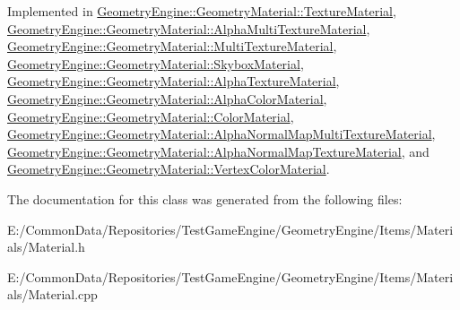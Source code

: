 Implemented in \mbox{\hyperlink{class_geometry_engine_1_1_geometry_material_1_1_texture_material_a985cdde7240f2acb18cd2944c5ca6193}{Geometry\+Engine\+::\+Geometry\+Material\+::\+Texture\+Material}}, \mbox{\hyperlink{class_geometry_engine_1_1_geometry_material_1_1_alpha_multi_texture_material_ad230fe9a3f174933644c40ed10ba15a7}{Geometry\+Engine\+::\+Geometry\+Material\+::\+Alpha\+Multi\+Texture\+Material}}, \mbox{\hyperlink{class_geometry_engine_1_1_geometry_material_1_1_multi_texture_material_a5f07e3b2b0867d3905f912159ef2f67b}{Geometry\+Engine\+::\+Geometry\+Material\+::\+Multi\+Texture\+Material}}, \mbox{\hyperlink{class_geometry_engine_1_1_geometry_material_1_1_skybox_material_a7760402d819462db205dadf3f370af73}{Geometry\+Engine\+::\+Geometry\+Material\+::\+Skybox\+Material}}, \mbox{\hyperlink{class_geometry_engine_1_1_geometry_material_1_1_alpha_texture_material_aba7adf21a4bc2bb34f8a16d0008ed64e}{Geometry\+Engine\+::\+Geometry\+Material\+::\+Alpha\+Texture\+Material}}, \mbox{\hyperlink{class_geometry_engine_1_1_geometry_material_1_1_alpha_color_material_ab1fdac9dfbf26f3f712c345845ef9983}{Geometry\+Engine\+::\+Geometry\+Material\+::\+Alpha\+Color\+Material}}, \mbox{\hyperlink{class_geometry_engine_1_1_geometry_material_1_1_color_material_afc9bcbd2091f6592dfb8a6ace1d4adfb}{Geometry\+Engine\+::\+Geometry\+Material\+::\+Color\+Material}}, \mbox{\hyperlink{class_geometry_engine_1_1_geometry_material_1_1_alpha_normal_map_multi_texture_material_a38d93e639375db048fc688c4a9848029}{Geometry\+Engine\+::\+Geometry\+Material\+::\+Alpha\+Normal\+Map\+Multi\+Texture\+Material}}, \mbox{\hyperlink{class_geometry_engine_1_1_geometry_material_1_1_alpha_normal_map_texture_material_a237fc12dc3eda51d90c16e95e6b2042c}{Geometry\+Engine\+::\+Geometry\+Material\+::\+Alpha\+Normal\+Map\+Texture\+Material}}, and \mbox{\hyperlink{class_geometry_engine_1_1_geometry_material_1_1_vertex_color_material_a11bf01fb1d5ef41fb1a9cf4080c98b8c}{Geometry\+Engine\+::\+Geometry\+Material\+::\+Vertex\+Color\+Material}}.



The documentation for this class was generated from the following files\+:\begin{DoxyCompactItemize}
\item 
E\+:/\+Common\+Data/\+Repositories/\+Test\+Game\+Engine/\+Geometry\+Engine/\+Items/\+Materials/Material.\+h\item 
E\+:/\+Common\+Data/\+Repositories/\+Test\+Game\+Engine/\+Geometry\+Engine/\+Items/\+Materials/Material.\+cpp\end{DoxyCompactItemize}
